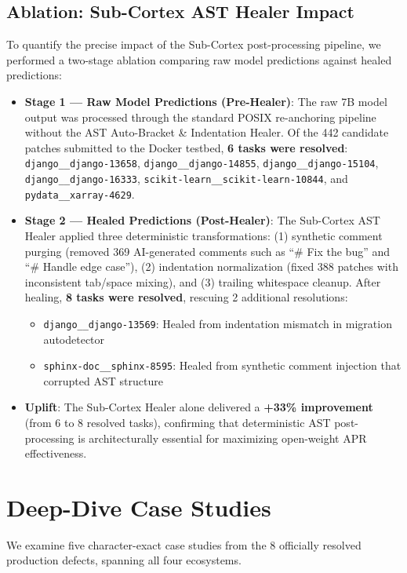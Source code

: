 \documentclass[10pt,twocolumn,letterpaper]{article}
\begin{document}
\subsection{Ablation: Sub-Cortex AST Healer Impact}
To quantify the precise impact of the Sub-Cortex post-processing pipeline, we performed a two-stage ablation comparing raw model predictions against healed predictions:
\begin{itemize}
    \item \textbf{Stage 1 --- Raw Model Predictions (Pre-Healer)}: The raw 7B model output was processed through the standard POSIX re-anchoring pipeline without the AST Auto-Bracket \& Indentation Healer. Of the 442 candidate patches submitted to the Docker testbed, \textbf{6 tasks were resolved}: \texttt{django\_\_django-13658}, \texttt{django\_\_django-14855}, \texttt{django\_\_django-15104}, \texttt{django\_\_django-16333}, \texttt{scikit-learn\_\_scikit-learn-10844}, and \texttt{pydata\_\_xarray-4629}.
    \item \textbf{Stage 2 --- Healed Predictions (Post-Healer)}: The Sub-Cortex AST Healer applied three deterministic transformations: (1) synthetic comment purging (removed 369 AI-generated comments such as ``\# Fix the bug'' and ``\# Handle edge case''), (2) indentation normalization (fixed 388 patches with inconsistent tab/space mixing), and (3) trailing whitespace cleanup. After healing, \textbf{8 tasks were resolved}, rescuing 2 additional resolutions:
    \begin{itemize}
        \item \texttt{django\_\_django-13569}: Healed from indentation mismatch in migration autodetector
        \item \texttt{sphinx-doc\_\_sphinx-8595}: Healed from synthetic comment injection that corrupted AST structure
    \end{itemize}
    \item \textbf{Uplift}: The Sub-Cortex Healer alone delivered a \textbf{+33\% improvement} (from 6 to 8 resolved tasks), confirming that deterministic AST post-processing is architecturally essential for maximizing open-weight APR effectiveness.
\end{itemize}

\section{Deep-Dive Case Studies}

We examine five character-exact case studies from the 8 officially resolved production defects, spanning all four ecosystems.
\end{document}
